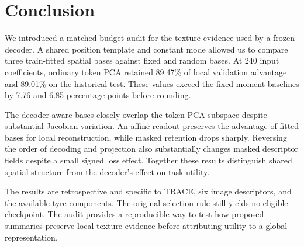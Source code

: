 \section{Conclusion}\label{sec:conclusion}
We introduced a matched-budget audit for the texture evidence used by a frozen decoder. A shared position template and constant mode allowed us to compare three train-fitted spatial bases against fixed and random bases. At 240 input coefficients, ordinary token PCA retained 89.47\% of local validation advantage and 89.01\% on the historical test. These values exceed the fixed-moment baselines by 7.76 and 6.85 percentage points before rounding.

The decoder-aware bases closely overlap the token PCA subspace despite substantial Jacobian variation. An affine readout preserves the advantage of fitted bases for local reconstruction, while masked retention drops sharply. Reversing the order of decoding and projection also substantially changes masked descriptor fields despite a small signed loss effect. Together these results distinguish shared spatial structure from the decoder's effect on task utility.

The results are retrospective and specific to TRACE, six image descriptors, and the available tyre components. The original selection rule still yields no eligible checkpoint. The audit provides a reproducible way to test how proposed summaries preserve local texture evidence before attributing utility to a global representation.
